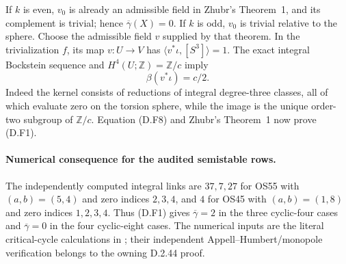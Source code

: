 If $k$ is even, $v_0$ is already an admissible field in Zhubr's
Theorem~1, and its complement is trivial; hence
$\overline\gamma(X)=0$.
If $k$ is odd, $v_0$ is trivial relative to the sphere.  Choose
the admissible field $v$ supplied by that theorem.  In the
trivialization $f$, its map $v:U\to V$ has
$\langle v^*\iota,[S^3]\rangle=1$.
The exact integral Bockstein sequence and
$H^4(U;\mathbb Z)=\mathbb Z/c$ imply
\[
                         \beta(v^*\iota)=c/2.
\]
Indeed the kernel consists of reductions of integral degree-three
classes, all of which evaluate zero on the torsion sphere, while
the image is the unique order-two subgroup of $\mathbb Z/c$.
Equation (D.F8) and Zhubr's Theorem~1 now prove (D.F1).

\paragraph{Numerical consequence for the audited semistable rows.}
The independently computed integral links are $37,7,27$ for
OS55 with $(a,b)=(5,4)$ and zero indices $2,3,4$, and $4$ for
OS45 with $(a,b)=(1,8)$ and zero indices $1,2,3,4$.
Thus (D.F1) gives $\overline\gamma=2$ in the three cyclic-four
cases and $\overline\gamma=0$ in the four cyclic-eight cases.
The numerical inputs are the literal critical-cycle calculations
in ; their
independent Appell--Humbert/monopole verification belongs to the
owning D.2.44 proof.
